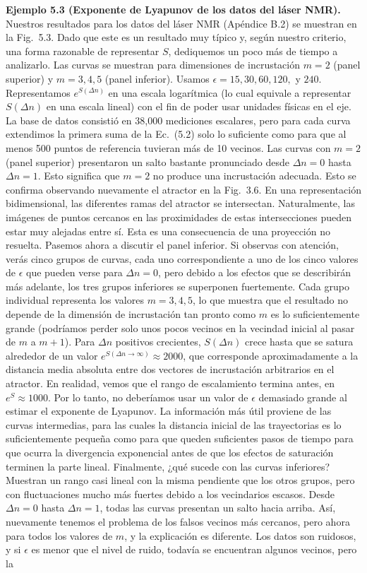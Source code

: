 \documentclass[10pt,a4paper]{book}
\begin{document}
\textbf{Ejemplo 5.3 (Exponente de Lyapunov de los datos del láser NMR).} Nuestros resultados para los datos del láser NMR (Apéndice B.2) se muestran en la Fig.~5.3. Dado que este es un resultado muy típico y, según nuestro criterio, una forma razonable de representar $S$, dediquemos un poco más de tiempo a analizarlo. Las curvas se muestran para dimensiones de incrustación $m = 2$ (panel superior) y $m = 3, 4, 5$ (panel inferior). Usamos $\epsilon = 15, 30, 60, 120,$ y $240$. Representamos $e^{S(\Delta n)}$ en una escala logarítmica (lo cual equivale a representar $S(\Delta n)$ en una escala lineal) con el fin de poder usar unidades físicas en el eje. La base de datos consistió en 38,000 mediciones escalares, pero para cada curva extendimos la primera suma de la Ec.~(5.2) solo lo suficiente como para que al menos 500 puntos de referencia tuvieran más de 10 vecinos. Las curvas con $m = 2$ (panel superior) presentaron un salto bastante pronunciado desde $\Delta n = 0$ hasta $\Delta n = 1$. Esto significa que $m = 2$ no produce una incrustación adecuada. Esto se confirma observando nuevamente el atractor en la Fig.~3.6. En una representación bidimensional, las diferentes ramas del atractor se intersectan. Naturalmente, las imágenes de puntos cercanos en las proximidades de estas intersecciones pueden estar muy alejadas entre sí. Esta es una consecuencia de una proyección no resuelta. Pasemos ahora a discutir el panel inferior. Si observas con atención, verás cinco grupos de curvas, cada uno correspondiente a uno de los cinco valores de $\epsilon$ que pueden verse para $\Delta n = 0$, pero debido a los efectos que se describirán más adelante, los tres grupos inferiores se superponen fuertemente. Cada grupo individual representa los valores $m = 3, 4, 5$, lo que muestra que el resultado no depende de la dimensión de incrustación tan pronto como $m$ es lo suficientemente grande (podríamos perder solo unos pocos vecinos en la vecindad inicial al pasar de $m$ a $m + 1$). Para $\Delta n$ positivos crecientes, $S(\Delta n)$ crece hasta que se satura alrededor de un valor $e^{S(\Delta n \rightarrow \infty)} \approx 2000$, que corresponde aproximadamente a la distancia media absoluta entre dos vectores de incrustación arbitrarios en el atractor. En realidad, vemos que el rango de escalamiento termina antes, en $e^S \approx 1000$. Por lo tanto, no deberíamos usar un valor de $\epsilon$ demasiado grande al estimar el exponente de Lyapunov. La información más útil proviene de las curvas intermedias, para las cuales la distancia inicial de las trayectorias es lo suficientemente pequeña como para que queden suficientes pasos de tiempo para que ocurra la divergencia exponencial antes de que los efectos de saturación terminen la parte lineal. Finalmente, ¿qué sucede con las curvas inferiores? Muestran un rango casi lineal con la misma pendiente que los otros grupos, pero con fluctuaciones mucho más fuertes debido a los vecindarios escasos. Desde $\Delta n = 0$ hasta $\Delta n = 1$, todas las curvas presentan un salto hacia arriba. Así, nuevamente tenemos el problema de los falsos vecinos más cercanos, pero ahora para todos los valores de $m$, y la explicación es diferente. Los datos son ruidosos, y si $\epsilon$ es menor que el nivel de ruido, todavía se encuentran algunos vecinos, pero la 
\end{document}
